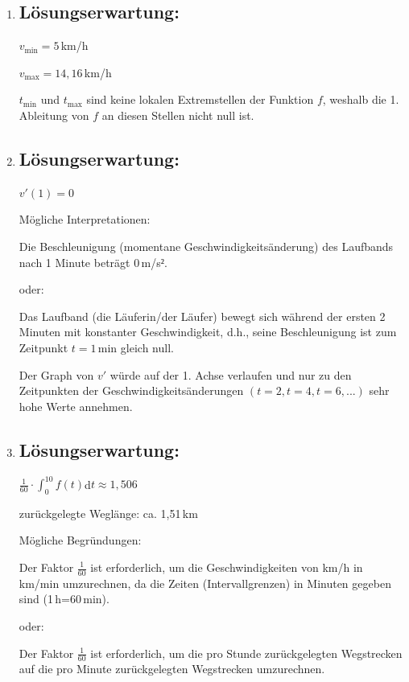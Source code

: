 \begin{langesbeispiel}
{\begin{enumerate}
zurückgelegte Weglänge: $0,5\,\text{h}\cdot 11,57\,\text{km/h}=5,785$\,km

	\item \subsection{Lösungserwartung:}
	
	$v_\text{min}=5$\,km/h
	
	$v_\text{max}=14,16$\,km/h\leer
	
	$t_\text{min}$ und $t_\text{max}$ sind keine lokalen Extremstellen der Funktion $f$, weshalb die 1. Ableitung von $f$ an diesen Stellen nicht null ist.

\item \subsection{Lösungserwartung:}
	
$v'(1)=0$

Mögliche Interpretationen:

Die Beschleunigung (momentane Geschwindigkeitsänderung) des Laufbands nach 1 Minute beträgt 0\,m/s$²$.

oder:

Das Laufband (die Läuferin/der Läufer) bewegt sich während der ersten 2 Minuten mit konstanter Geschwindigkeit, d.h., seine Beschleunigung ist zum Zeitpunkt $t=1$\,min gleich null.\leer

Der Graph von $v'$ würde auf der 1. Achse verlaufen und nur zu den Zeitpunkten der Geschwindigkeitsänderungen $(t=2, t=4, t=6,...)$ sehr hohe Werte annehmen.

\item \subsection{Lösungserwartung:}
	
$\frac{1}{60}\cdot\int^{10}_0{f(t)}$d$t\approx 1,506$

zurückgelegte Weglänge: ca. 1,51\,km\leer

Mögliche Begründungen:

Der Faktor $\frac{1}{60}$ ist erforderlich, um die Geschwindigkeiten von km/h in km/min umzurechnen, da die Zeiten (Intervallgrenzen) in Minuten gegeben sind (1\,h=60\,min).

oder:

Der Faktor $\frac{1}{60}$ ist erforderlich, um die pro Stunde zurückgelegten Wegstrecken auf die pro Minute zurückgelegten Wegstrecken umzurechnen.\leer


\end{enumerate}}
\end{langesbeispiel}
